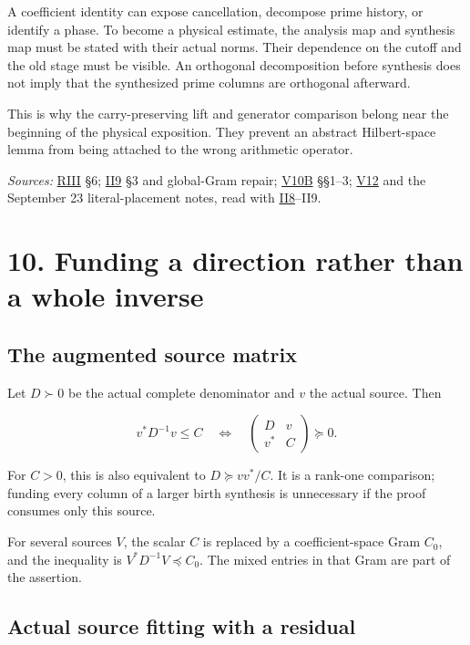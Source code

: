 \documentclass[
  10pt,
  a4paper,
  10pt,
  oneside,
  openany]{book}
\begin{document}
A coefficient identity can expose cancellation, decompose prime history,
or identify a phase. To become a physical estimate, the analysis map and
synthesis map must be stated with their actual norms. Their dependence
on the cutoff and the old stage must be visible. An orthogonal
decomposition before synthesis does not imply that the synthesized prime
columns are orthogonal afterward.

This is why the carry-preserving lift and generator comparison belong
near the beginning of the physical exposition. They prevent an abstract
Hilbert-space lemma from being attached to the wrong arithmetic
operator.

\emph{Sources:} \hyperref[source-riii]{RIII} §6;
\hyperref[source-ii9]{II9} §3 and global-Gram repair;
\hyperref[source-v10b]{V10B} §§1--3; \hyperref[source-v12]{V12} and the
September 23 literal-placement notes, read with
\hyperref[source-ii8]{II8}--II9.

\section{10. Funding a direction rather than a whole
inverse}\label{ch-funding}

\subsection{The augmented source
matrix}\label{the-augmented-source-matrix}

Let \(D\succ0\) be the actual complete denominator and \(v\) the actual
source. Then

\[
v^*D^{-1}v\le C
\quad\Longleftrightarrow\quad
\begin{pmatrix}D&v\\v^*&C\end{pmatrix}\succeq0.
\tag{10.1}\label{eq:10.1}
\]

For \(C>0\), this is also equivalent to \(D\succeq vv^*/C\). It is a
rank-one comparison; funding every column of a larger birth synthesis is
unnecessary if the proof consumes only this source.

For several sources \(V\), the scalar \(C\) is replaced by a
coefficient-space Gram \(C_0\), and the inequality is
\(V^*D^{-1}V\preceq C_0\). The mixed entries in that Gram are part of
the assertion.

\subsection{Actual source fitting with a
residual}\label{actual-source-fitting-with-a-residual}
\end{document}
